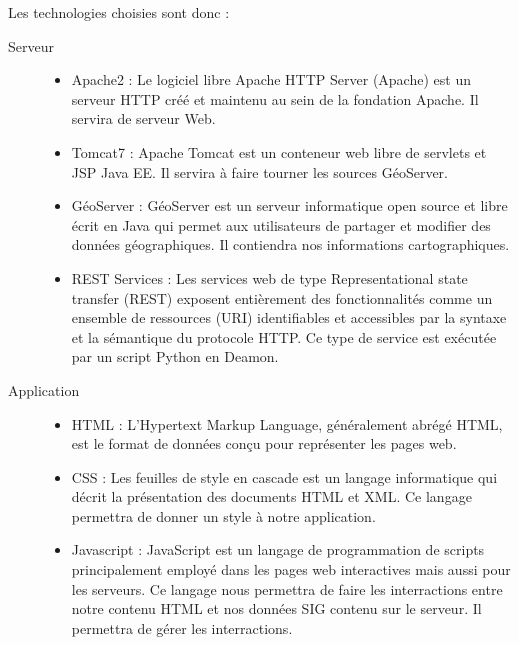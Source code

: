 Les technologies choisies sont donc :

\begin{description}

  \item[Serveur] \hfill 
    \begin{itemize}
      \item Apache2 : Le logiciel libre Apache HTTP Server (Apache) est un serveur HTTP créé et maintenu au sein de la fondation Apache. Il servira de serveur Web.
      \item Tomcat7 : Apache Tomcat est un conteneur web libre de servlets et JSP Java EE. Il servira à faire tourner les sources GéoServer.
      \item GéoServer : GéoServer est un serveur informatique open source et libre écrit en Java qui permet aux utilisateurs de partager et modifier des données géographiques. Il contiendra nos informations cartographiques.
      \item REST Services : Les services web de type Representational state transfer (REST) exposent entièrement des fonctionnalités comme un ensemble de ressources (URI) identifiables et accessibles par la syntaxe et la sémantique du protocole HTTP. Ce type de service est exécutée par un script Python en Deamon.
    \end{itemize}

  \item[Application] \hfill 
    \begin{itemize}
      \item HTML : L’Hypertext Markup Language, généralement abrégé HTML, est le format de données conçu pour représenter les pages web. 
      \item CSS : Les feuilles de style en cascade est un langage informatique qui décrit la présentation des documents HTML et XML. Ce langage permettra de donner un style à notre application.
      \item Javascript : JavaScript est un langage de programmation de scripts principalement employé dans les pages web interactives mais aussi pour les serveurs. Ce langage nous permettra de faire les interractions entre notre contenu HTML et nos données SIG contenu sur le serveur. Il permettra de gérer les interractions.
    \end{itemize}


\end{description}
